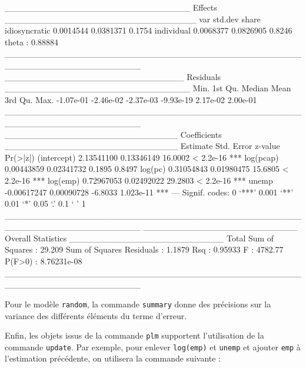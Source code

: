 \documentclass[a4paper]{article}
\begin{document}
\begin{Schunk}
\begin{Soutput}
______________________________ Effects _______________________________
                    var   std.dev  share
idiosyncratic 0.0014544 0.0381371 0.1754
individual    0.0068377 0.0826905 0.8246
theta   :  0.88884  
______________________________________________________________________ 
_____________________________ Residuals ______________________________
     Min.   1st Qu.    Median      Mean   3rd Qu.      Max. 
-1.07e-01 -2.46e-02 -2.37e-03 -9.93e-19  2.17e-02  2.00e-01 
______________________________________________________________________ 
____________________________ Coefficients ____________________________
               Estimate  Std. Error z-value  Pr(>|z|)    
(intercept)  2.13541100  0.13346149 16.0002 < 2.2e-16 ***
log(pcap)    0.00443859  0.02341732  0.1895    0.8497    
log(pc)      0.31054843  0.01980475 15.6805 < 2.2e-16 ***
log(emp)     0.72967053  0.02492022 29.2803 < 2.2e-16 ***
unemp       -0.00617247  0.00090728 -6.8033 1.023e-11 ***
---
Signif. codes:  0 ‘***’ 0.001 ‘**’ 0.01 ‘*’ 0.05 ‘.’ 0.1 ‘ ’ 1 
______________________________________________________________________ 
_________________________ Overall Statistics _________________________
Total Sum of Squares       : 29.209
Sum of Squares Residuals   : 1.1879
Rsq                        : 0.95933
F                          : 4782.77
P(F>0)                     : 8.76231e-08
______________________________________________________________________ 
\end{Soutput}
\end{Schunk}

Pour le modèle \texttt{random}, la commande \texttt{summary} donne des
précisions sur la variance des différents éléments du terme d'erreur.

Enfin, les objets issus de la commande \texttt{plm} supportent l'utilisation de
la commande \texttt{update}. Par exemple, pour enlever
\texttt{log(emp)} et \texttt{unemp} et ajouter \texttt{emp} à l'estimation précédente, on
utilisera la commande suivante :
\end{document}
